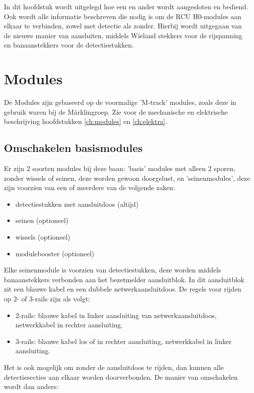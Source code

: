 \documentclass[12pt,a4paper]{report}
\newcommand*{\marklin}{M\"{a}rklin}
\begin{document}
In dit hoofdstuk wordt uitgelegd hoe een en ander wordt aangesloten en bediend. Ook wordt alle informatie beschreven die nodig is om de RCU H0-modules aan elkaar te verbinden, zowel met detectie als zonder. Hierbij wordt uitgegaan van de nieuwe manier van aansluiten, middels Wieland stekkers voor de rijspanning en banaanstekkers voor de detectiestukken.

\section{Modules}
De Modules zijn gebaseerd op de voormalige 'M-track' modules, zoals deze in gebruik waren bij de \marklin groep. Zie voor de mechanische  en elektrische beschrijving hoofdstukken \ref{ch:modules} en \ref{ch:elektra}.

\subsection{Omschakelen basismodules}
Er zijn 2 soorten modules bij deze baan: 'basis' modules met alleen 2 sporen, zonder wissels of seinen, deze worden gewoon doorgelust, en 'seinenmodules', deze zijn voorzien van een of meerdere van de volgende zaken:

\begin{itemize}
\item detectiestukken met aansluitdoos (altijd)
\item seinen (optioneel)
\item wissels (optioneel)
\item modulebooster (optioneel)
\end{itemize}

Elke seinenmodule is voorzien van detectiestukken, deze worden middels banaanstekkers verbonden aan het bezetmelder aansluitblok.  In dit aansluitblok zit een blauwe kabel en een dubbele netwerkaansluitdoos. De regels voor rijden op 2- of 3-rails zijn als volgt:

\begin{itemize}
\item 2-rails: blauwe kabel in linker aansluiting van netwerkaansluitdoos, netwerkkabel in rechter aansluiting.
\item 3-rails: blauwe kabel los of in rechter aansluiting, netwerkkabel in linker aansluiting.
\end{itemize}

Het is ook mogelijk om zonder de aansluitdoos te rijden, dan kunnen alle detectiesecties aan elkaar worden doorverbonden. De manier van omschakelen wordt dan anders:
\end{document}
